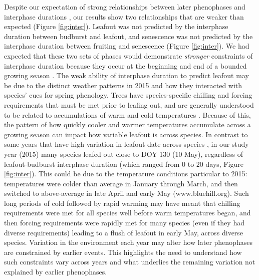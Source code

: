 \documentclass{article}
\begin{document}
\par Despite our expectation of strong relationships between later phenophases and interphase durations , our results show two relationships that are weaker than expected (Figure \ref{fig:inter}). Leafout was not predicted by the interphase duration between budburst and leafout, and senescence was not predicted by the interphase duration between fruiting and senescence (Figure \ref{fig:inter}). We had expected that these two sets of phases would demonstrate \textit{stronger} constraints of interphase duration because they occur at the beginning and end of a bounded growing season \citep{letten2013}. The weak ability of interphase duration to predict leafout may be due to the distinct weather patterns in 2015 and how they interacted with species' cues for spring phenology. Trees have species-specific chilling and forcing requirements that must be met prior to leafing out, and are generally understood to be related to accumulations of warm and cold temperatures \citep[e.g.,][]{schwartz2010,chuine2010,clark2014b}. Because of this, the pattern of how quickly cooler and warmer temperatures accumulate across a growing season can impact how variable leafout is across species. In contrast to some years that have high variation in leafout date across species \citep{lechowicz1995}, in our study year (2015) many species leafed out close to DOY 130 (10 May), regardless of leafout-budburst interphase duration (which ranged from 0 to 20 days, Figure \ref{fig:inter}). This could be due to the temperature conditions particular to 2015: temperatures were colder than average in January through March, and then switched to above-average in late April and early May (www.bluehill.org). Such long periods of cold followed by rapid warming may have meant that chilling requirements were met for all species well before warm temperatures began, and then forcing requirements were rapidly met for many species (even if they had diverse requirements) leading to a flush of leafout in early May, across diverse species. Variation in the environment each year may alter how later phenophases are constrained by earlier events. This highlights the need to understand how such constraints vary across years and what underlies the remaining variation not explained by earlier phenophases.
\end{document}
